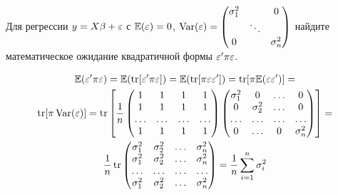 \begin{problem}
Для регрессии $y = X\beta + \varepsilon$ с $\mathbb{E}(\varepsilon) = 0$, $\operatorname{Var}(\varepsilon) = \begin{pmatrix}
\sigma_1^2 &  & 0 \\
  & \ddots &   \\
0 &  & \sigma^2_n
\end{pmatrix}$ найдите математическое ожидание квадратичной формы $\varepsilon' \pi \varepsilon$.



\begin{sol}
\begin{multline*}
\mathbb{E}(\varepsilon' \pi \varepsilon) = \mathbb{E}(\operatorname{tr}[\varepsilon' \pi \varepsilon]) = \mathbb{E}(\operatorname{tr}[\pi \varepsilon \varepsilon']) = \operatorname{tr}[\pi \mathbb{E}(\varepsilon\varepsilon')]  =\\
\operatorname{tr}[\pi \operatorname{Var}(\varepsilon)] = \operatorname{tr}\left[ \frac{1}{n} \begin{pmatrix}
1 & 1 & 1 & 1 \\
1 & 1 & 1 & 1 \\
\ldots & \ldots & \ldots & \ldots \\
1 & 1 & 1 & 1 \\
\end{pmatrix} \begin{pmatrix}
\sigma_1^2 & 0 & \ldots & 0 \\
0 & \sigma_2^2 & \ldots & 0 \\
\ldots & \ldots & \ldots & \ldots \\
0 & \ldots & 0 & \sigma_n^2 \\
\end{pmatrix} \right] = \\
\frac{1}{n} \operatorname{tr}\begin{pmatrix}
\sigma_1^2 & \sigma_2^2 & \ldots & \sigma_n^2 \\
\sigma_1^2 & \sigma_2^2 & \ldots & \sigma_n^2 \\
\ldots & \ldots & \ldots & \ldots \\
\sigma_1^2 & \sigma_2^2 & \ldots & \sigma_n^2 \\
\end{pmatrix} = \frac{1}{n} \sum_{i=1}^n \sigma_i^2
\end{multline*}
\end{sol}
\end{problem}


